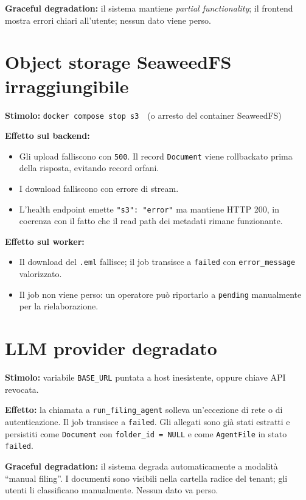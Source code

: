 \textbf{Graceful degradation:} il sistema mantiene \emph{partial functionality};
il frontend mostra errori chiari all'utente; nessun dato viene perso.

\section{Object storage SeaweedFS irraggiungibile}
\label{sec:fail_s3}

\textbf{Stimolo:} \texttt{docker compose stop s3}\ \ (o arresto del container SeaweedFS)

\textbf{Effetto sul backend:}
\begin{itemize}[leftmargin=*]
    \item Gli upload falliscono con \texttt{500}. Il record \texttt{Document} viene
          rollbackato prima della risposta, evitando record orfani.
    \item I download falliscono con errore di stream.
    \item L'health endpoint emette \texttt{"s3": "error"} ma mantiene HTTP 200,
          in coerenza con il fatto che il read path dei metadati rimane funzionante.
\end{itemize}

\textbf{Effetto sul worker:}
\begin{itemize}[leftmargin=*]
    \item Il download del \texttt{.eml} fallisce; il job transisce a \texttt{failed}
          con \texttt{error\_message} valorizzato.
    \item Il job non viene perso: un operatore pu\`o riportarlo a \texttt{pending}
          manualmente per la rielaborazione.
\end{itemize}

\section{LLM provider degradato}
\label{sec:fail_llm}

\textbf{Stimolo:} variabile \texttt{BASE\_URL} puntata a host inesistente, oppure
chiave API revocata.

\textbf{Effetto:} la chiamata a \texttt{run\_filing\_agent} solleva un'eccezione
di rete o di autenticazione. Il job transisce a \texttt{failed}. Gli allegati sono
gi\`a stati estratti e persistiti come \texttt{Document} con \texttt{folder\_id = NULL}
e come \texttt{AgentFile} in stato \texttt{failed}.

\textbf{Graceful degradation:} il sistema degrada automaticamente a modalit\`a
``manual filing''. I documenti sono visibili nella cartella radice del tenant; gli
utenti li classificano manualmente. Nessun dato va perso.

